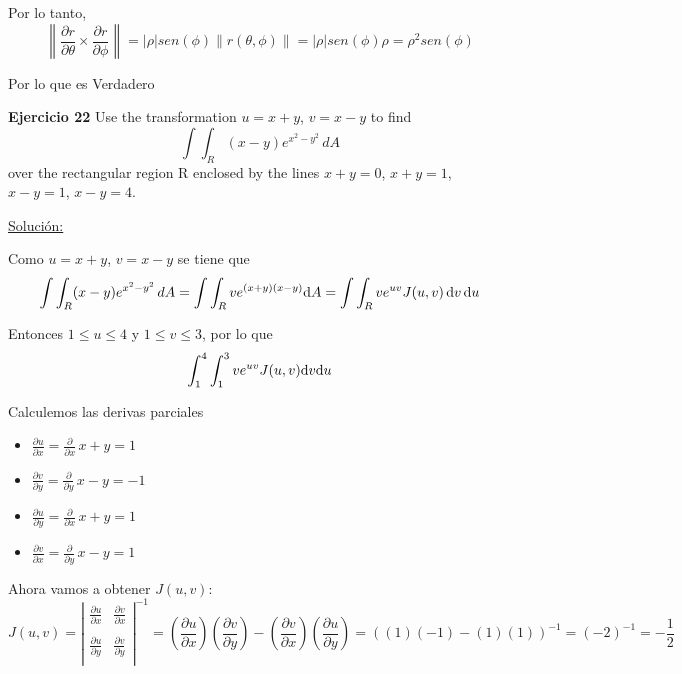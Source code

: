\documentclass{report}
\newcommand{\s}{\underline{Soluci\'{o}n:}}
\begin{document}
	Por lo tanto, $$\left \| \frac{\partial r}{\partial \theta} \times \frac{\partial r}{\partial \phi}\right \|= \left | \rho \right | sen(\phi)\left \| r(\theta, \phi) \right \|=\left | \rho \right | sen(\phi)\rho=\rho ^2 sen(\phi) $$
	
	Por lo que es Verdadero
	
	\textbf{Ejercicio 22} Use the transformation $u = x + y$, $v = x - y$ to find
	\[\int\int_R (x-y)e^{x^2-y^2} \, dA\]
	over the rectangular region R enclosed by the lines
	$x + y = 0$, $x + y = 1$, $x - y = 1$, $x - y = 4$.
	
	\s 
	
	Como $u = x + y$, $v = x - y$ se tiene que 
	\[\int\int_R (x-y)e^{x^2-y^2} \, dA = \int\int_R v e^{(x + y)(x - y)} \text dA= \int\int_R v e^{uv} J(u, v) \, \text dv \, \text du\]

	Entonces $1 \leq u \leq 4$ y $1 \leq v \leq 3$, por lo que
	\[\int_1^4\int_1^3 v e^{uv} J(u, v) \text dv \text du\]
	
	Calculemos las derivas parciales 
	\begin{itemize}
		\item $\frac{\partial u}{\partial x} = \frac{\partial}{\partial x}\, x + y =  1 $
		\item $\frac{\partial v}{\partial y} = \frac{\partial}{\partial y}\, x - y = -1$
		\item $\frac{\partial u}{\partial y} = \frac{\partial}{\partial x}\, x + y =  1 $
		\item $\frac{\partial v}{\partial x} = \frac{\partial}{\partial y}\, x - y = 1$
	\end{itemize} 
	
	Ahora vamos a obtener $J(u, v)$:
	\[J(u, v) = \left| \begin{array}{cc}
	\frac{\partial u}{\partial x} & \frac{\partial v}{\partial x}  \\ 
	& \\
	\frac{\partial u}{\partial y} & \frac{\partial v}{\partial y} \\
	\end{array} \right|^{-1} 
	= \left( \frac{\partial u}{\partial x}\right) \left( \frac{\partial v }{\partial y}\right)  - \left( \frac{\partial v}{\partial x}\right) \left( \frac{\partial u}{\partial y}\right) 
	= ((1)(-1) - (1)(1))^{-1} 
	= (-2)^{-1} 
	= -\frac{1}{2}\]
	
	
\end{document}
